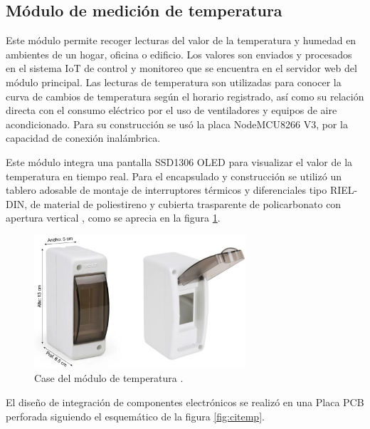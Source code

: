 \subsection{Módulo de medición de temperatura}

Este módulo permite recoger lecturas del valor de la temperatura y humedad en ambientes de un hogar, oficina o edificio. Los valores son enviados y procesados en el sistema IoT de control y monitoreo que se encuentra en el servidor web del módulo principal. Las lecturas de temperatura son utilizadas para conocer la curva de cambios de temperatura según el horario registrado, así como su relación directa con el consumo eléctrico por el uso de ventiladores y equipos de aire acondicionado. Para su construcción se usó la placa NodeMCU8266 V3, por la capacidad de conexión inalámbrica. 

Este módulo integra una pantalla SSD1306 OLED para visualizar el valor de la temperatura en tiempo real. Para el encapsulado y construcción se utilizó un tablero adosable de montaje de interruptores térmicos y diferenciales tipo RIEL-DIN, de material de poliestireno y cubierta trasparente de policarbonato con apertura vertical \citep{WEBSITE:17}, como se aprecia en la figura \ref{fig:casetemp}.


\begin{figure}[htpb]
\centering 
\includegraphics[width=0.7\textwidth]{./Figures/casetemp.png}
\caption{Case del módulo de temperatura \protect\footnotemark.}
\label{fig:casetemp}
\end{figure}


El diseño de integración de componentes electrónicos se realizó en una Placa PCB perforada siguiendo el esquemático de la figura \ref{fig:citemp}.

